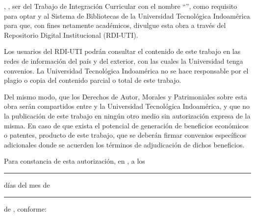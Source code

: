 
\UTIAutoresPronombre, \UTIAutoresTexto, \UTIVerboDeclaro{} ser \UTIAutorEtiquetaMin{} del Trabajo de Integración Curricular con el nombre ``\UTITituloProyecto'', como requisito para optar \UTIFraseOptarTituloProfesional{} y \UTIVerboAutorizo{} al Sistema de Bibliotecas de la Universidad Tecnológica Indoamérica para que, con fines netamente académicos, divulgue esta obra a través del Repositorio Digital Institucional (RDI-UTI).

Los usuarios del RDI-UTI podrán consultar el contenido de este trabajo en las redes de información del país y del exterior, con las cuales la Universidad tenga convenios. La Universidad Tecnológica Indoamérica no se hace responsable por el plagio o copia del contenido parcial o total de este trabajo.
	        
Del mismo modo, \UTIVerboAcepto{} que los Derechos de Autor, Morales y Patrimoniales sobre esta obra serán compartidos entre \UTIAutoresPoseedor{} y la Universidad Tecnológica Indoamérica, y que no \UTIVerboTramito{} la publicación de este trabajo en ningún otro medio sin autorización expresa de la misma. En caso de que exista el potencial de generación de beneficios económicos o patentes, producto de este trabajo, \UTIVerboAcepto{} que se deberán firmar convenios específicos adicionales donde se acuerden los términos de adjudicación de dichos beneficios.

Para constancia de esta autorización, en \UTICiudadPais, a los \rule{1.2cm}{0.4pt} días del mes de \rule{1.2cm}{0.4pt} de \UTIAnio, \UTIVerboFirmo{} conforme:

\vspace{1cm}

\UTIRepositorioAutoresBloque
